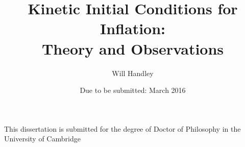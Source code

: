 \title{Kinetic Initial Conditions for Inflation:\\ Theory and Observations}

\author{Will Handley}
\date{Due to be submitted: March 2016}

\maketitle

\centerline{%
 This dissertation is submitted for the degree of Doctor of Philosophy
in the University of Cambridge }

